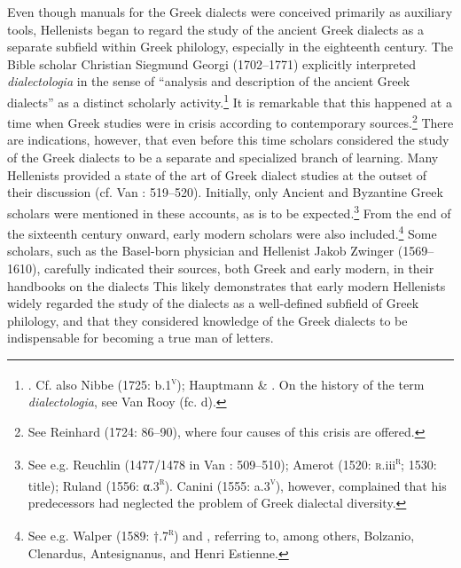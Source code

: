 \documentclass[output=paper]{langsci/langscibook}
\begin{document}
Even though manuals for the Greek dialects were conceived primarily as auxiliary tools, Hellenists began to regard the study of the ancient Greek dialects as a separate subfield within Greek philology, especially in the eighteenth century. The Bible scholar Christian Siegmund Georgi (1702–1771) explicitly interpreted \textit{dialectologia} in the sense of “analysis and description of the ancient Greek dialects” as a distinct scholarly activity.\footnote{\citet[16]{Georgi1733}. Cf. also Nibbe (1725: b.1\textsc{\textsuperscript{v}}); Hauptmann \& \citet[15]{Schmid1737}. On the history of the term \textit{dialectologia}, see Van Rooy (fc. d).} It is remarkable that this happened at a time when Greek studies were in crisis according to contemporary sources.\footnote{See Reinhard (1724: 86–90), where four causes of this crisis are offered.} There are indications, however, that even before this time scholars considered the study of the Greek dialects to be a separate and specialized branch of learning. Many Hellenists provided a state of the art of Greek dialect studies at the outset of their discussion (cf. Van \citealt{Rooy2014}: 519–520). Initially, only Ancient and Byzantine Greek scholars were mentioned in these accounts, as is to be expected.\footnote{See e.g. Reuchlin (1477/1478 in Van \citealt{Rooy2014}: 509–510); Amerot (1520: \textsc{r.}iii\textsc{\textsuperscript{r}}\textsc{;} \textsc{1530:} title); Ruland (1556: α.3\textsc{\textsuperscript{r}}). Canini (1555: a.3\textsc{\textsuperscript{v}}), however, complained that his predecessors had neglected the problem of Greek dialectal diversity.} From the end of the sixteenth century onward, early modern scholars were also included.\footnote{See e.g. Walper (1589: †.7\textsc{\textsuperscript{r}}) and \citet[1]{Schmidt1604}, referring to, among others, Bolzanio, Clenardus, Antesignanus, and Henri Estienne.} Some scholars, such as the Basel-born physician and Hellenist Jakob Zwinger (1569–1610), carefully indicated their sources, both Greek and early modern, in their handbooks on the dialects \citep{Zwinger1605} This likely demonstrates that early modern Hellenists widely regarded the study of the dialects as a well-defined subfield of Greek philology, and that they considered knowledge of the Greek dialects to be indispensable for becoming a true man of letters.
\end{document}
